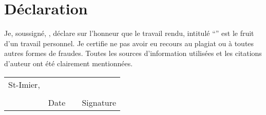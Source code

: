\chapter*{Déclaration}

\noindent Je, soussigné, \myauthor, déclare sur l’honneur que le travail rendu, intitulé \enquote{\mysubject} est le fruit d’un travail personnel. Je certifie ne pas avoir eu recours au plagiat ou à toutes autres formes de fraudes. Toutes les sources d’information utilisées et les citations d’auteur ont été clairement mentionnées.


\vspace{2cm}

\newcommand{\mysignatureblock}[3]{%
	\begin{tabular}{llp{2em}l} 
		#1 & \hspace{4cm}        & & \hspace{4cm} \\\cline{2-2}\cline{4-4}
		&                     & & \\[-3mm]
		& {\footnotesize #2}  & & {\footnotesize #3}
	\end{tabular}
}

\mysignatureblock{St-Imier,}{Date}{Signature}
